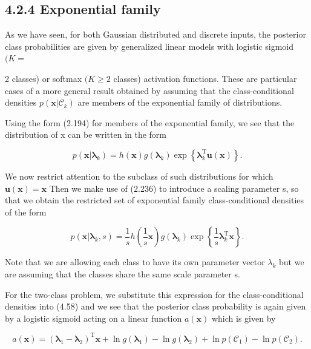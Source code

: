 \documentclass[
  10
]{article}
\begin{document}
\subsection{4.2.4 Exponential family}\label{exponential-family}

As we have seen, for both Gaussian distributed and discrete inputs, the
posterior class probabilities are given by generalized linear models
with logistic sigmoid \(( K =\)

2 classes) or softmax \(( K \geqslant 2\) classes) activation functions.
These are particular cases of a more general result obtained by assuming
that the class-conditional densities
\(p ( \mathbf { x } | \mathcal { C } _ { k } )\) are members of the
exponential family of distributions.

Using the form (2.194) for members of the exponential family, we see
that the distribution of x can be written in the form

\[
p (\mathbf {x} | \boldsymbol {\lambda} _ {k}) = h (\mathbf {x}) g (\boldsymbol {\lambda} _ {k}) \exp \left\{\boldsymbol {\lambda} _ {k} ^ {\mathrm{T}} \mathbf {u} (\mathbf {x}) \right\}.\tag{4.83}
\]

We now restrict attention to the subclass of such distributions for
which \(\mathbf { u } ( \mathbf { x } ) = \mathbf { x }\) Then we make
use of (2.236) to introduce a scaling parameter s, so that we obtain the
restricted set of exponential family class-conditional densities of the
form

\[
p (\mathbf {x} | \boldsymbol {\lambda} _ {k}, s) = \frac {1}{s} h \left(\frac {1}{s} \mathbf {x}\right) g (\boldsymbol {\lambda} _ {k}) \exp \left\{\frac {1}{s} \boldsymbol {\lambda} _ {k} ^ {\mathrm{T}} \mathbf {x} \right\}.\tag{4.84}
\]

Note that we are allowing each class to have its own parameter vector
\(\lambda _ { k }\) but we are assuming that the classes share the same
scale parameter s.

For the two-class problem, we substitute this expression for the
class-conditional densities into (4.58) and we see that the posterior
class probability is again given by a logistic sigmoid acting on a
linear function \(a ( \mathbf { x } )\) which is given by

\[
a (\mathbf {x}) = \left(\boldsymbol {\lambda} _ {1} - \boldsymbol {\lambda} _ {2}\right) ^ {\mathrm{T}} \mathbf {x} + \ln g \left(\boldsymbol {\lambda} _ {1}\right) - \ln g \left(\boldsymbol {\lambda} _ {2}\right) + \ln p \left(\mathcal {C} _ {1}\right) - \ln p \left(\mathcal {C} _ {2}\right).\tag{4.85}
\]
\end{document}
